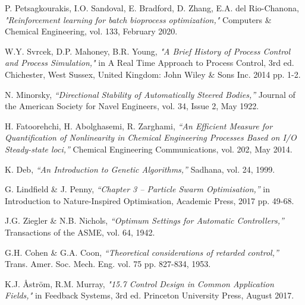 \documentclass[conference]{IEEEtran}
\theoremstyle{definition}
\begin{document}
\begin{thebibliography}{1}
P. Petsagkourakis, I.O. Sandoval, E. Bradford, D. Zhang, E.A. del Rio-Chanona, \emph{"Reinforcement learning for batch bioprocess optimization,"} Computers \& Chemical Engineering, vol. 133, February 2020.

W.Y. Svrcek, D.P. Mahoney, B.R. Young, \emph{"A Brief History of Process Control and Process Simulation,"} in A Real Time Approach to Process Control, 3rd ed. Chichester, West Sussex, United Kingdom: John Wiley \& Sons Inc. 2014 pp. 1-2.


N. Minorsky, \emph{“Directional Stability of Automatically Steered Bodies,”} Journal of the American Society for Navel Engineers, vol. 34, Issue 2, May 1922.

H. Fatoorehchi, H. Abolghasemi, R. Zarghami, \emph{“An Efficient Measure for Quantification of Nonlinearity in Chemical Engineering Processes Based on I/O Steady-state loci,”} Chemical Engineering Communications, vol. 202, May 2014.

K. Deb, \emph{“An Introduction to Genetic Algorithms,”} Sadhana, vol. 24, 1999.

G. Lindfield \& J. Penny, \emph{“Chapter 3 – Particle Swarm Optimisation,”} in Introduction to Nature-Inspired Optimisation, Academic Press, 2017 pp. 49-68.

J.G. Ziegler \& N.B. Nichols, \emph{“Optimum Settings for Automatic Controllers,”} Transactions of the ASME, vol. 64, 1942.

G.H. Cohen \& G.A. Coon, \emph{“Theoretical considerations of retarded control,”} Trans. Amer. Soc. Mech. Eng. vol. 75 pp. 827-834, 1953.


K.J. Åström, R.M. Murray, \emph{"15.7 Control Design in Common Application Fields,"} in Feedback Systems, 3rd ed. Princeton University Press, August 2017.


\end{thebibliography}
\end{document}
